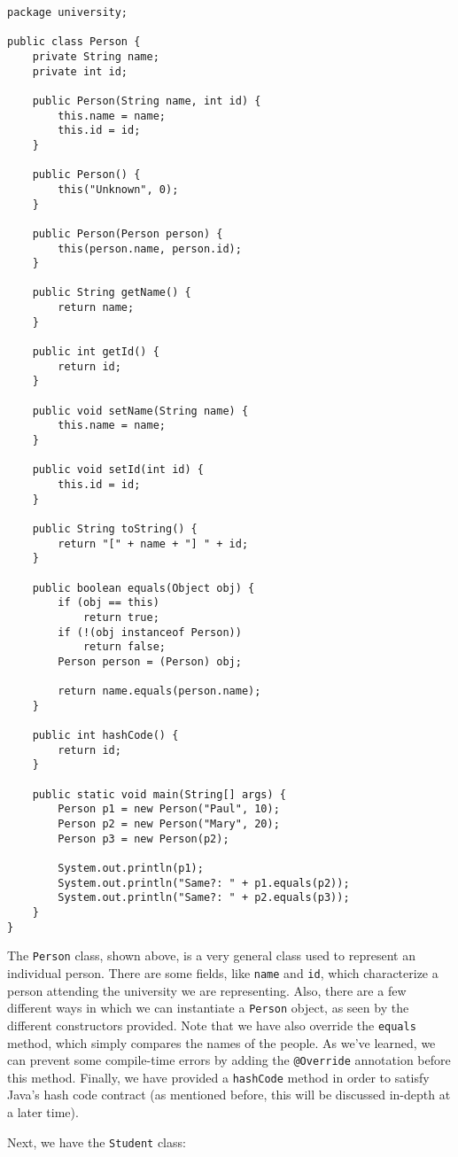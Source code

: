 \begin{lstlisting}
package university;

public class Person {
	private String name;
	private int id;

	public Person(String name, int id) {
		this.name = name;
		this.id = id;
	}

	public Person() {
		this("Unknown", 0);
	}

	public Person(Person person) {
		this(person.name, person.id);
	}

	public String getName() {
		return name;
	}

	public int getId() {
		return id;
	}

	public void setName(String name) {
		this.name = name;
	}

	public void setId(int id) {
		this.id = id;
	}

	public String toString() {
		return "[" + name + "] " + id;
	}

	public boolean equals(Object obj) {
		if (obj == this)
			return true;
		if (!(obj instanceof Person))
			return false;
		Person person = (Person) obj;

		return name.equals(person.name);
	}

	public int hashCode() {
		return id;
	}

	public static void main(String[] args) {
		Person p1 = new Person("Paul", 10);
		Person p2 = new Person("Mary", 20);
		Person p3 = new Person(p2);

		System.out.println(p1);
		System.out.println("Same?: " + p1.equals(p2));
		System.out.println("Same?: " + p2.equals(p3));
	}
}
\end{lstlisting}


The \verb!Person! class, shown above, is a very general class used to represent an individual person. There are some fields, like \verb!name! and \verb!id!, which characterize a person attending the university we are representing. Also, there are a few different ways in which we can instantiate a \verb!Person! object, as seen by the different constructors provided. Note that we have also override the \verb!equals! method, which simply compares the names of the people. As we've learned, we can prevent some compile-time errors by adding the \verb!@Override! annotation before this method. Finally, we have provided a \verb!hashCode! method in order to satisfy Java's hash code contract (as mentioned before, this will be discussed in-depth at a later time).


Next, we have the \verb!Student! class:

